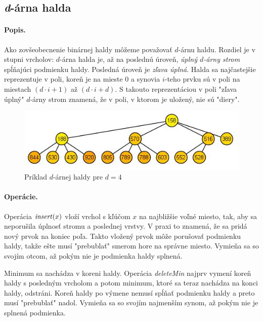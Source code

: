\def\find{\mathop{\mathit{find}}}
\def\delete{\mathop{\mathit{delete}}}

\subsection{\emph{d}-árna halda} 
\paragraph{Popis.}
Ako zovšeobecnenie binárnej haldy môžeme považovať $d$-árnu haldu. Rozdiel je v stupni vrcholov:
$d$-árna halda je, až na poslednú úroveň, \emph{úplný $d$-árny strom} spĺňajúci podmienku haldy. Posledná úroveň je 
\emph{zľava úplná}.
Halda sa najčastejšie reprezentuje v poli, koreň je na mieste $0$ a synovia $i$-teho prvku sú v poli na miestach 
$(d\cdot i + 1)$ až $(d\cdot i + d)$.
S takouto reprezentáciou v poli "zľava úplný" $d$-árny strom znamená, že v poli, v ktorom je uložený, nie sú "diery". 

\begin{figure}
\includegraphics[width=\columnwidth]{obrazky/daryheap.png}
\caption{\emph{} 
Príklad $d$-árnej haldy pre $d = 4$} 
\label{img:komp} 
\end{figure}

\paragraph{Operácie.}
Operácia $\mathop{\mathit{insert}}(x)$ vloží vrchol s kľúčom $x$ na najbližšie voľné miesto, tak, aby sa neporušila úplnosť stromu 
a poslednej vrstvy. V praxi to znamená, že sa pridá nový prvok na koniec poľa. Takto vložený prvok môže porušovať 
podmienku haldy, takže ešte musí "prebublať" smerom hore na správne miesto. Vymieňa sa so svojím otcom, až pokým 
nie je podmienka haldy splnená.

Minimum sa nachádza v koreni haldy. Operácia \emph{deleteMin} najprv vymení koreň haldy s posledným vrcholom a potom 
minimum, ktoré sa teraz nachádza na konci haldy, odstráni. Koreň haldy po výmene nemusí spĺňať podmienku haldy a 
preto musí "prebublať" nadol. Vymieňa sa so svojím najmenším synom, až pokým nie je splnená podmienka.

